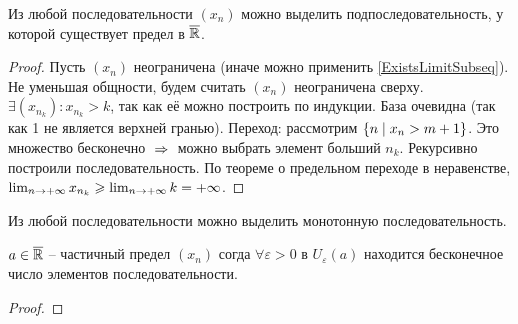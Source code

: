 \begin{theorem}
    Из любой последовательности $(x_n)$ можно выделить подпоследовательность, у которой существует предел в $\overline{\mathbb{R}}$.
    \label{ExistsLimitSubseqExt}
\end{theorem}
\begin{proof}
    Пусть $(x_n)$ неограничена (иначе можно применить \ref{ExistsLimitSubseq}). Не уменьшая общности, будем считать $(x_n)$ неограничена сверху. $\exists (x_{n_k}) : x_{n_k} > k$, так как её можно построить по индукции. База очевидна (так как 1 не является верхней гранью). Переход: рассмотрим $\{ n \;\vert\; x_n > m + 1 \}$. Это множество бесконечно $\thus$ можно выбрать элемент больший $n_k$. Рекурсивно построили последовательность. По теореме о предельном переходе в неравенстве, $\lim_{n\to+\infty} x_{n_k} \geqslant \lim_{n\to+\infty} k = +\infty$.
\end{proof}

\begin{theorem}
    Из любой последовательности можно выделить монотонную последовательность.
\end{theorem}


\begin{theorem}
    $a \in \overline{\mathbb{R}}$ -- частичный предел $(x_n)$ согда $\forall \varepsilon > 0$ в $U_\varepsilon(a)$ находится бесконечное число элементов последовательности.
    \label{SublimitCriteria}
\end{theorem}
\begin{proof}
\end{proof}

